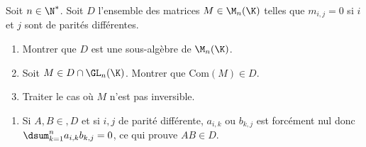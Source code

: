 \begin{enonce}
\begin{exercise}[ID={RMS134 E560},subtitle={Oral
    Mines-Ponts},theme={algebre},annee={2023},concours={mines-ponts},filiere={MP}]
  Soit $n\in\N^*$. Soit $D$ l'ensemble des matrices $M\in\M_n(\K)$
  telles que $m_{i,j}=0$ si $i$ et $j$ sont de parités différentes.
  \begin{enumerate}
  \item Montrer que $D$ est une sous-algèbre de $\M_n(\K)$.
  \item Soit $M\in D\cap\GL_n(\K)$. Montrer que $\mathrm{Com}(M)\in
    D$.
  \item Traiter le cas où $M$ n'est pas inversible.
  \end{enumerate}
\end{exercise}
\begin{solution}
  \begin{enumerate}
  \item Si $A,B\in, D$ et si $i,j$ de parité différente, $a_{i,k}$ ou
    $b_{k,j}$ est forcément nul donc $\dsum_{k=1}^na_{i,k}b_{k,j}=0$,
    ce qui prouve $AB\in D$.
  \end{enumerate}
\end{solution}
\end{enonce}